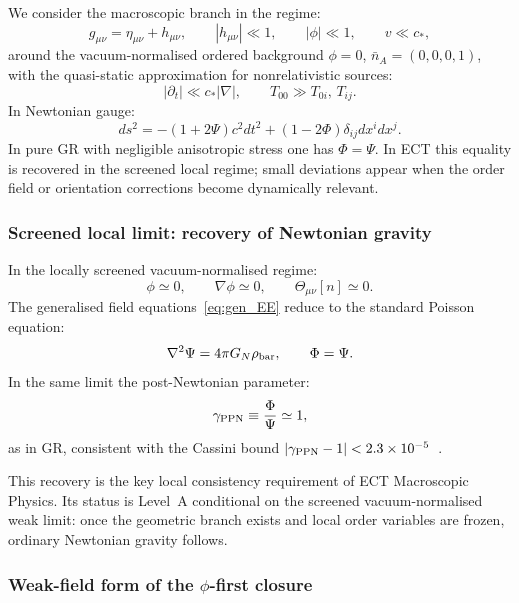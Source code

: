 \documentclass[11pt,a4paper]{article}
\numberwithin{equation}{section}
\begin{document}
We consider the macroscopic branch in the regime:
\begin{equation}
  \label{eq:weak_field_expansion}
  g_{\mu\nu}=\eta_{\mu\nu}+h_{\mu\nu},
  \qquad |h_{\mu\nu}|\ll 1,
  \qquad |\phi|\ll 1,
  \qquad v\ll c_*,
\end{equation}
around the vacuum-normalised ordered background
$\phi=0$, $\bar{n}_A=(0,0,0,1)$, with the quasi-static approximation
for nonrelativistic sources:
\begin{equation}
  \label{eq:quasistatic}
  |\partial_t|\ll c_*|\nabla|,
  \qquad T_{00}\gg T_{0i},\,T_{ij}.
\end{equation}
In Newtonian gauge:
\begin{equation}
  \label{eq:newtonian_gauge}
  ds^2 = -(1+2\Psi)c^2dt^2 + (1-2\Phi)\delta_{ij}dx^idx^j.
\end{equation}
In pure GR with negligible anisotropic stress one has $\Phi=\Psi$.
In ECT this equality is recovered in the screened local regime;
small deviations appear when the order field or orientation corrections
become dynamically relevant.

\subsubsection*{Screened local limit: recovery of Newtonian gravity}

In the locally screened vacuum-normalised regime:
\[
\phi\simeq 0,\qquad \nabla\phi\simeq 0,\qquad \Theta_{\mu\nu}[n]\simeq 0.
\]
The generalised field equations~\eqref{eq:gen_EE} reduce to the
standard Poisson equation:
\begin{equation}
  \label{eq:Poisson_standard}
  \nabla^2\Psi = 4\pi G_N\rho_{\rm bar},
  \qquad \Phi=\Psi.
\end{equation}
In the same limit the post-Newtonian parameter:
\begin{equation}
  \label{eq:PPN_gamma}
  \gamma_{\rm PPN}\equiv\frac{\Phi}{\Psi}\simeq 1,
\end{equation}
as in GR, consistent with the Cassini bound
$|\gamma_{\rm PPN}-1|<2.3\times10^{-5}$~\cite{Bertotti2003}.

This recovery is the key local consistency requirement of ECT
Macroscopic Physics.
Its status is Level~A conditional on the screened vacuum-normalised weak
limit: once the geometric branch exists and local order variables are
frozen, ordinary Newtonian gravity follows.

\subsubsection*{Weak-field form of the $\phi$-first closure}
\end{document}
